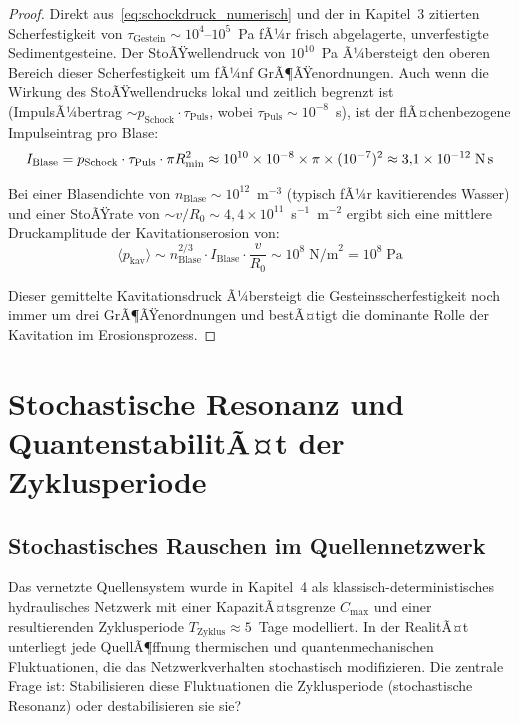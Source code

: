 ﻿\documentclass[12pt,a4paper]{report}
\begin{document}
\begin{proof}
	Direkt aus~\eqref{eq:schockdruck_numerisch} und der in Kapitel~3 zitierten Scherfestigkeit von $\tau_\mathrm{Gestein} \sim 10^4$--$10^5$~Pa fÃ¼r frisch abgelagerte, unverfestigte Sedimentgesteine. Der StoÃŸwellendruck von $10^{10}$~Pa Ã¼bersteigt den oberen Bereich dieser Scherfestigkeit um fÃ¼nf GrÃ¶ÃŸenordnungen. Auch wenn die Wirkung des StoÃŸwellendrucks lokal und zeitlich begrenzt ist (ImpulsÃ¼bertrag $\sim p_\mathrm{Schock}\cdot\tau_\mathrm{Puls}$, wobei $\tau_\mathrm{Puls} \sim 10^{-8}$~s), ist der flÃ¤chenbezogene Impulseintrag pro Blase:
	\begin{equation}
		I_\mathrm{Blase} = p_\mathrm{Schock}\cdot\tau_\mathrm{Puls}\cdot\pi R_\mathrm{min}^2 \approx 10^{10}\times10^{-8}\times\pi\times(10^{-7})^2 \approx 3{,}1\times10^{-12}\;\text{N\,s}
		\label{eq:impuls_blase}
	\end{equation}
	
	Bei einer Blasendichte von $n_\mathrm{Blase} \sim 10^{12}$~m$^{-3}$ (typisch fÃ¼r kavitierendes Wasser) und einer StoÃŸrate von $\sim v/R_0 \sim 4{,}4\times10^{11}$~s$^{-1}$~m$^{-2}$ ergibt sich eine mittlere Druckamplitude der Kavitationserosion von:
	\begin{equation}
		\langle p_\mathrm{kav}\rangle \sim n_\mathrm{Blase}^{2/3}\cdot I_\mathrm{Blase}\cdot\frac{v}{R_0} \sim 10^8\;\text{N/m}^2 = 10^8\;\text{Pa}
		\label{eq:mittlerer_kavdruck}
	\end{equation}
	
	Dieser gemittelte Kavitationsdruck Ã¼bersteigt die Gesteinsscherfestigkeit noch immer um drei GrÃ¶ÃŸenordnungen und bestÃ¤tigt die dominante Rolle der Kavitation im Erosionsprozess.
\end{proof}

\section{Stochastische Resonanz und QuantenstabilitÃ¤t der Zyklusperiode}
\label{sec:stochastische_resonanz}

\subsection{Stochastisches Rauschen im Quellennetzwerk}

Das vernetzte Quellensystem wurde in Kapitel~4 als klassisch-deterministisches hydraulisches Netzwerk mit einer KapazitÃ¤tsgrenze $C_\mathrm{max}$ und einer resultierenden Zyklusperiode $T_\mathrm{Zyklus} \approx 5$~Tage modelliert. In der RealitÃ¤t unterliegt jede QuellÃ¶ffnung thermischen und quantenmechanischen Fluktuationen, die das Netzwerkverhalten stochastisch modifizieren. Die zentrale Frage ist: Stabilisieren diese Fluktuationen die Zyklusperiode (stochastische Resonanz) oder destabilisieren sie sie?
\end{document}
